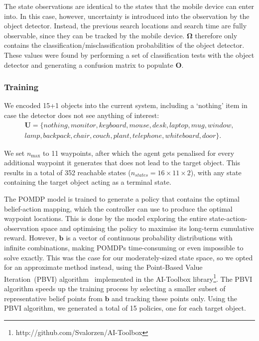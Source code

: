 \documentclass[runningheads]{llncs}
\begin{document}
The state observations are identical to the states that the mobile device can enter into. 
In this case, however, uncertainty is introduced into the observation by the object detector.
Instead, the previous search locations and search time are fully observable, since they can be tracked by the mobile device.
$\mathbf{\Omega}$ therefore only contains the classification/misclassification probabilities of the object detector.
These values were found by performing a set of classification tests with the object detector and generating a confusion matrix to populate $\mathbf{O}$.

\subsubsection{Training}

We encoded 15+1 objects into the current system, including a `nothing' item in case the detector does not see anything of interest:
\begin{equation*}
  \begin{split}
    \mathbf{U} = \{ nothing, monitor, keyboard, mouse, desk, laptop, mug, window,\\ 
      lamp, backpack, chair, couch, plant, telephone, whiteboard, door \}.
  \end{split}
\end{equation*}

\noindent We set $n_{\max}$ to 11 waypoints, after which the agent gets penalised for every additional waypoint it generates that does not lead to the target object. 
This results in a total of 352 reachable states ($n_{states} = 16\times11\times2$), with any state containing the target object acting as a terminal state.

The POMDP model is trained to generate a policy that contains the optimal belief-action mapping, which the controller can use to produce the optimal waypoint locations.
This is done by the model exploring the entire state-action-observation space and optimising the policy to maximise its long-term cumulative reward.
However, $\mathbf{b}$ is a vector of continuous probability distributions with infinite combinations, making POMDPs time-consuming or even impossible to solve exactly.
This was the case for our moderately-sized state space, so we opted for an approximate method instead, using the Point-Based Value Iteration~(PBVI) algorithm~\cite{pineau2003point} implemented in the AI-Toolbox library\footnote{http://github.com/Svalorzen/AI-Toolbox}.
The PBVI algorithm speeds up the training process by selecting a smaller subset of representative belief points from $\mathbf{b}$ and tracking these points only. 
Using the PBVI algorithm, we generated a total of 15 policies, one for each target object. 
\end{document}
